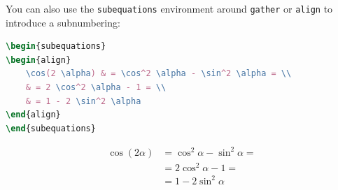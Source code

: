 You can also use the \lstinline[language=TeX]|subequations| environment around \lstinline[language=TeX]|gather| or \lstinline[language=TeX]|align| to introduce a subnumbering:
\begin{lstlisting}[language=TeX]
\begin{subequations}
\begin{align}
    \cos(2 \alpha) & = \cos^2 \alpha - \sin^2 \alpha = \\
    & = 2 \cos^2 \alpha - 1 = \\
    & = 1 - 2 \sin^2 \alpha
\end{align}
\end{subequations}
\end{lstlisting}
\begin{subequations}
\begin{align}
    \cos(2 \alpha) & = \cos^2 \alpha - \sin^2 \alpha = \\
    & = 2 \cos^2 \alpha - 1 = \\
    & = 1 - 2 \sin^2 \alpha
\end{align}
\end{subequations}
